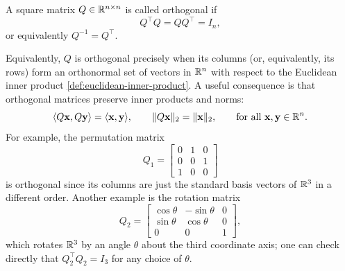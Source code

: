 \begin{definition}
    A square matrix $Q \in \mathbb{R}^{n \times n}$ is called orthogonal if
    \begin{equation*}
        Q^\top Q = Q Q^\top = I_n,
    \end{equation*}
    or equivalently $Q^{-1} = Q^\top$.
\end{definition}
Equivalently, $Q$ is orthogonal precisely when its columns (or, equivalently, its rows) form an orthonormal set of vectors in $\mathbb{R}^n$ with respect to the Euclidean inner product \eqref{def:euclidean-inner-product}. A useful consequence is that orthogonal matrices preserve inner products and norms:
\begin{equation*}
    \langle Q\mathbf{x}, Q\mathbf{y} \rangle = \langle \mathbf{x}, \mathbf{y} \rangle, \qquad \|Q\mathbf{x}\|_2 = \|\mathbf{x}\|_2, \qquad \text{for all } \mathbf{x}, \mathbf{y} \in \mathbb{R}^n.
\end{equation*}
For example, the permutation matrix
\begin{equation*}
    Q_1 = \begin{bmatrix}
        0 & 1 & 0 \\
        0 & 0 & 1 \\
        1 & 0 & 0
    \end{bmatrix}
\end{equation*}
is orthogonal since its columns are just the standard basis vectors of $\mathbb{R}^3$ in a different order. Another example is the rotation matrix
\begin{equation*}
    Q_2 = \begin{bmatrix}
        \cos\theta & -\sin\theta & 0 \\
        \sin\theta & \cos\theta & 0 \\
        0 & 0 & 1
    \end{bmatrix},
\end{equation*}
which rotates $\mathbb{R}^3$ by an angle $\theta$ about the third coordinate axis; one can check directly that $Q_2^\top Q_2 = I_3$ for any choice of $\theta$.

